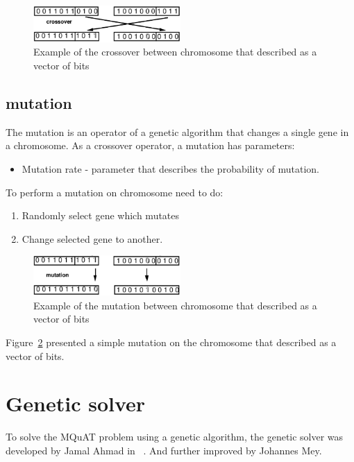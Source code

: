 \begin{figure}
	\centering
	\includegraphics[width=0.5\textwidth]{images/crossoverVector.png}
	\caption[Example of the crossover]{Example of the crossover between chromosome that described as a vector of bits}
	\label{fig:crossoverVector}
\end{figure}

\subsection{mutation}\label{sec:GeneticAlgorithmMutation}

The mutation is an operator of a genetic algorithm that changes a single gene in a chromosome. As a crossover operator, a mutation has parameters:

\begin{itemize}
	\item Mutation rate - parameter that describes the probability of mutation.
\end{itemize}

To perform a mutation on chromosome need to do:

\begin{enumerate}
	\item Randomly select gene which mutates
	\item Change selected gene to another.
\end{enumerate}

\begin{figure}
	\centering
	\includegraphics[width=0.5\textwidth]{images/MutationVector.png}
	\caption[Example of the mutation]{Example of the mutation between chromosome that described as a vector of bits}
	\label{fig:MutationVector}
\end{figure}

Figure~\ref{fig:MutationVector} presented a simple mutation on the chromosome that described as a vector of bits.




\section{Genetic solver}
To solve the MQuAT problem using a genetic algorithm, the genetic solver was developed by Jamal Ahmad in ~\cite{ahmad18}. And further improved by Johannes Mey.

